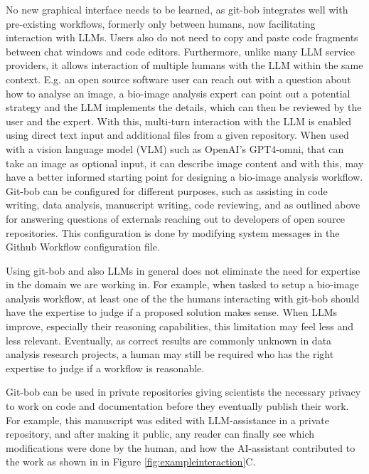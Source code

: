 \documentclass{ecai}
\begin{document}
No new graphical interface needs to be learned, as git-bob integrates well with pre-existing workflows, formerly only between humans, now facilitating interaction with LLMs. Users also do not need to copy and paste code fragments between chat windows and code editors. Furthermore, unlike many LLM service providers, it allows interaction of multiple humans with the LLM within the same context. E.g. an open source software user can reach out with a question about how to analyse an image, a bio-image analysis expert can point out a potential  strategy and the LLM implements the details, which can then be reviewed by the user and the expert. With this, multi-turn interaction with the LLM is enabled using direct text input and additional files from a given repository. When used with a vision language model (VLM) such as OpenAI's GPT4-omni, that can take an image as optional input, it can describe image content and with this, may have a better informed starting point for designing a bio-image analysis workflow.
Git-bob can be configured for different purposes, such as assisting in code writing, data analysis, manuscript writing, code reviewing, and as outlined above for answering questions of externals reaching out to developers of open source repositories. This configuration is done by modifying system messages in the Github Workflow configuration file. 

Using git-bob and also LLMs in general does not eliminate the need for expertise in the domain we are working in. For example, when tasked to setup a bio-image analysis workflow, at least one of the the humans interacting with git-bob should have the expertise to judge if a proposed solution makes sense. When LLMs improve, especially their reasoning capabilities, this limitation may feel less and less relevant. Eventually, as correct results are commonly unknown in data analysis research projects, a human  may still be required who has the right expertise to judge if a workflow is reasonable.

Git-bob can be used in private repositories giving scientists the necessary privacy to work on code and documentation before they eventually publish their work. For example, this manuscript was edited with LLM-assistance in a private repository, and after making it public, any reader can finally see which modifications were done by the human, and how the AI-assistant contributed to the work as shown in in Figure \ref{fig:exampleinteraction}C.

\end{document}
